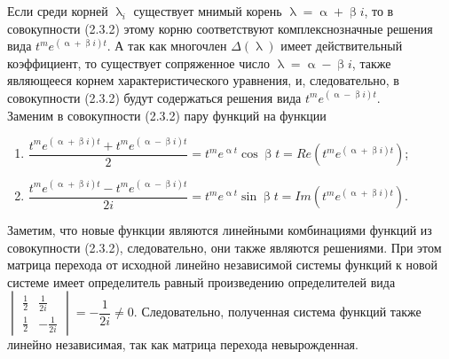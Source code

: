 \documentclass[a4paper, 12pt]{report}
\renewcommand{\alpha}{\upalpha}
\renewcommand{\beta}{\upbeta}
\renewcommand{\lambda}{\uplambda}
\begin{document}
	Если среди корней $\lambda_i$ существует мнимый корень $\lambda = \alpha + \beta i$, то в совокупности (2.3.2) этому корню соответствуют комплекснозначные решения вида $t^me^{(\alpha + \beta i)t}$. А так как многочлен $\Delta(\lambda)$ имеет действительный коэффициент, то существует сопряженное число $\lambda = \alpha - \beta i$, также являющееся корнем характеристического уравнения, и, следовательно, в совокупности (2.3.2) будут содержаться решения вида $t^me^{(\alpha - \beta i)t}$.\\
	Заменим в совокупности (2.3.2) пару функций на функции\begin{enumerate}
		\item $\dfrac{t^me^{(\alpha + \beta i)t} + t^me^{(\alpha - \beta i)t}}{2} = t^me^{\alpha t}\cos\beta t = Re(t^me^{(\alpha + \beta i)t})$;
		\item $\dfrac{t^me^{(\alpha + \beta i)t} - t^me^{(\alpha - \beta i)t}}{2i} = t^me^{\alpha t}\sin\beta t = Im(t^me^{(\alpha + \beta i)t})$.
	\end{enumerate}
	Заметим, что новые функции являются линейными комбинациями функций из совокупности (2.3.2), следовательно, они также являются решениями. При этом матрица перехода от исходной линейно независимой системы функций к новой системе имеет определитель равный произведению определителей вида $\begin{vmatrix}
		\frac{1}{2} & \frac{1}{2i}\\
		\frac{1}{2} & -\frac{1}{2i}
	\end{vmatrix} = -\dfrac{1}{2i}\ne 0$. Следовательно, полученная система функций также линейно независимая, так как матрица перехода невырожденная.
\end{document}
